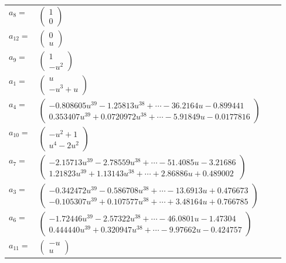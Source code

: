 \documentclass[1p]{elsarticle_modified}
\theoremstyle{definition}
\begin{document}
\begin{tabular}{m{7pt} m{180pt} m{7pt} m{180pt} }
\flushright $a_{8}=$&$\begin{pmatrix}1\\0\end{pmatrix}$ \\
\flushright $a_{12}=$&$\begin{pmatrix}0\\u\end{pmatrix}$ \\
\flushright $a_{9}=$&$\begin{pmatrix}1\\- u^2\end{pmatrix}$ \\
\flushright $a_{1}=$&$\begin{pmatrix}u\\- u^3+u\end{pmatrix}$ \\
\flushright $a_{4}=$&$\begin{pmatrix}-0.808605 u^{39}-1.25813 u^{38}+\cdots-36.2164 u-0.899441\\0.353407 u^{39}+0.0720972 u^{38}+\cdots-5.91849 u-0.0177816\end{pmatrix}$ \\
\flushright $a_{10}=$&$\begin{pmatrix}- u^2+1\\u^4-2 u^2\end{pmatrix}$ \\
\flushright $a_{7}=$&$\begin{pmatrix}-2.15713 u^{39}-2.78559 u^{38}+\cdots-51.4085 u-3.21686\\1.21823 u^{39}+1.13143 u^{38}+\cdots+2.86886 u+0.489002\end{pmatrix}$ \\
\flushright $a_{3}=$&$\begin{pmatrix}-0.342472 u^{39}-0.586708 u^{38}+\cdots-13.6913 u+0.476673\\-0.105307 u^{39}+0.107577 u^{38}+\cdots+3.48164 u+0.766785\end{pmatrix}$ \\
\flushright $a_{6}=$&$\begin{pmatrix}-1.72446 u^{39}-2.57322 u^{38}+\cdots-46.0801 u-1.47304\\0.444440 u^{39}+0.320947 u^{38}+\cdots-9.97662 u-0.424757\end{pmatrix}$ \\
\flushright $a_{11}=$&$\begin{pmatrix}- u\\u\end{pmatrix}$ \\

\end{tabular}
\end{document}
